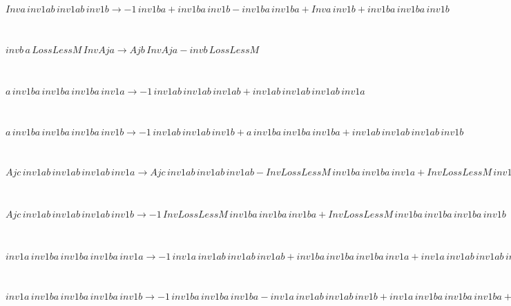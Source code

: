 \documentclass[rep10,leqno]{report}
\begin{document}
\begin{minipage}{6in}
$
Inva\,
 inv1ab\,
 inv1ab\,
 inv1b\rightarrow -1\,
 inv1ba + inv1ba\,
 inv1b - inv1ba\,
 inv1ba + Inva\,
 inv1b + inv1ba\,
 inv1ba\,
 inv1b
$
\end{minipage}\medskip \\
\begin{minipage}{6in}
$
invb\,
 a\,
 LossLessM\,
 InvAja\rightarrow Ajb\,
 InvAja - invb\,
 LossLessM
$
\end{minipage}\medskip \\
\begin{minipage}{6in}
$
a\,
 inv1ba\,
 inv1ba\,
 inv1ba\,
 inv1a\rightarrow -1\,
 inv1ab\,
 inv1ab\,
 inv1ab + inv1ab\,
 inv1ab\,
 inv1ab\,
 inv1a
$
\end{minipage}\medskip \\
\begin{minipage}{6in}
$
a\,
 inv1ba\,
 inv1ba\,
 inv1ba\,
 inv1b\rightarrow -1\,
 inv1ab\,
 inv1ab\,
 inv1b + a\,
 inv1ba\,
 inv1ba\,
 inv1ba + inv1ab\,
 inv1ab\,
 inv1ab\,
 inv1b
$
\end{minipage}\medskip \\
\begin{minipage}{6in}
$
Ajc\,
 inv1ab\,
 inv1ab\,
 inv1ab\,
 inv1a\rightarrow Ajc\,
 inv1ab\,
 inv1ab\,
 inv1ab - InvLossLessM\,
 inv1ba\,
 inv1ba\,
 inv1a + InvLossLessM\,
 inv1ba\,
 inv1ba\,
 inv1ba\,
 inv1a
$
\end{minipage}\medskip \\
\begin{minipage}{6in}
$
Ajc\,
 inv1ab\,
 inv1ab\,
 inv1ab\,
 inv1b\rightarrow -1\,
 InvLossLessM\,
 inv1ba\,
 inv1ba\,
 inv1ba + InvLossLessM\,
 inv1ba\,
 inv1ba\,
 inv1ba\,
 inv1b
$
\end{minipage}\medskip \\
\begin{minipage}{6in}
$
inv1a\,
 inv1ba\,
 inv1ba\,
 inv1ba\,
 inv1a\rightarrow -1\,
 inv1a\,
 inv1ab\,
 inv1ab\,
 inv1ab + inv1ba\,
 inv1ba\,
 inv1ba\,
 inv1a + inv1a\,
 inv1ab\,
 inv1ab\,
 inv1ab\,
 inv1a
$
\end{minipage}\medskip \\
\begin{minipage}{6in}
$
inv1a\,
 inv1ba\,
 inv1ba\,
 inv1ba\,
 inv1b\rightarrow -1\,
 inv1ba\,
 inv1ba\,
 inv1ba - inv1a\,
 inv1ab\,
 inv1ab\,
 inv1b + inv1a\,
 inv1ba\,
 inv1ba\,
 inv1ba + inv1ba\,
 inv1ba\,
 inv1ba\,
 inv1b + inv1a\,
 inv1ab\,
 inv1ab\,
 inv1ab\,
 inv1b
$
\end{minipage}\medskip \\
\end{document}
